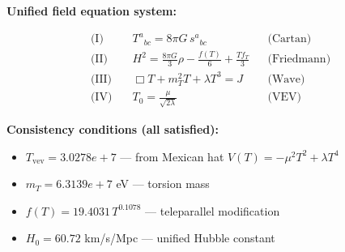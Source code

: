 
\textbf{Unified field equation system:}

\begin{align}
  \text{(I)} \quad & T^a{}_{bc} = 8\pi G \, s^a{}_{bc} && \text{(Cartan)} \\
  \text{(II)} \quad & H^2 = \frac{8\pi G}{3}\rho - \frac{f(T)}{6} + \frac{Tf_T}{3} && \text{(Friedmann)} \\
  \text{(III)} \quad & \Box T + m_T^2 T + \lambda T^3 = J && \text{(Wave)} \\
  \text{(IV)} \quad & T_0 = \frac{\mu}{\sqrt{2\lambda}} && \text{(VEV)}
\end{align}

\textbf{Consistency conditions (all satisfied):}
\begin{itemize}
  \item $T_{\text{vev}} = 3.0278e+7$ — from Mexican hat $V(T) = -\mu^2 T^2 + \lambda T^4$
  \item $m_T = 6.3139e+7$ eV — torsion mass
  \item $f(T) = 19.4031 \, T^{0.1078}$ — teleparallel modification
  \item $H_0 = 60.72$ km/s/Mpc — unified Hubble constant
\end{itemize}